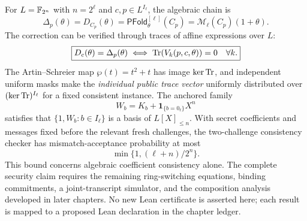 For $L=\mathbb{F}_{2^n}$ with $n=2^\ell$ and
$c,p\in L^{I_\ell}$, the algebraic chain is
\[
 \boxed{
 \Delta_p(\theta)
 =D_{C_p}(\theta)
 =\mathsf{PFold}^{[\ell]}_\theta(C_p)
 =\mathscr M_\ell(C_p)(1+\theta).
 }
\]
The correction can be verified through traces of affine
expressions over $L$:
\[
 \boxed{
 D_c(\theta)=\Delta_p(\theta)
 \iff
 \operatorname{Tr}(V_k(p,c,\theta))=0\quad\forall k.
 }
\]
The Artin--Schreier map $\wp(t)=t^2+t$ has image
$\ker\operatorname{Tr}$, and independent uniform masks make the
\emph{individual public trace vector} uniformly distributed
over $(\ker\operatorname{Tr})^{I_\ell}$ for a fixed consistent instance.
The anchored family
\[
 W_b=K_b+\mathbf 1_{\{b=0_\ell\}}X^n
\]
satisfies that $\{1,W_b:b\in I_\ell\}$ is a basis of
$L[X]_{\leq n}$. With secret coefficients and messages
fixed before the relevant fresh challenges, the
two-challenge consistency checker has mismatch-acceptance
probability at most
\[
 \boxed{\min\{1,(\ell+n)/2^n\}.}
\]
This bound concerns algebraic coefficient consistency alone.
The complete security claim requires the remaining
ring-switching equations, binding commitments, a
joint-transcript simulator, and the composition analysis
developed in later chapters. No new Lean certificate is
asserted here; each result is mapped to a proposed Lean
declaration in the chapter ledger.

